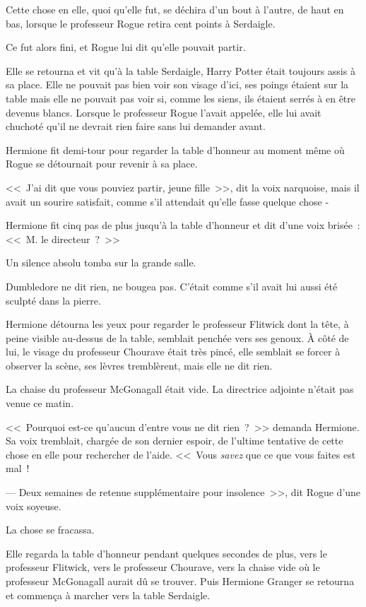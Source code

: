 Cette chose en elle, quoi qu'elle fut, se déchira d'un bout à l'autre, de haut en bas, lorsque le professeur Rogue retira cent points à Serdaigle.

Ce fut alors fini, et Rogue lui dit qu'elle pouvait partir.

Elle se retourna et vit qu'à la table Serdaigle, Harry Potter était toujours assis à sa place. Elle ne pouvait pas bien voir son visage d'ici, ses poings étaient sur la table mais elle ne pouvait pas voir si, comme les siens, ils étaient serrés à en être devenus blancs. Lorsque le professeur Rogue l'avait appelée, elle lui avait chuchoté qu'il ne devrait rien faire sans lui demander avant.

Hermione fit demi-tour pour regarder la table d'honneur au moment même où Rogue se détournait pour revenir à sa place.

<<~J'ai dit que vous pouviez partir, jeune fille~>>, dit la voix narquoise, mais il avait un sourire satisfait, comme s'il attendait qu'elle fasse quelque chose -

Hermione fit cinq pas de plus jusqu'à la table d'honneur et dit d'une voix brisée~: <<~M. le directeur~?~>>

Un silence absolu tomba sur la grande salle.

Dumbledore ne dit rien, ne bougea pas. C'était comme s'il avait lui aussi été sculpté dans la pierre.

Hermione détourna les yeux pour regarder le professeur Flitwick dont la tête, à peine visible au-dessus de la table, semblait penchée vers ses genoux. À côté de lui, le visage du professeur Chourave était très pincé, elle semblait se forcer à observer la scène, ses lèvres tremblèrent, mais elle ne dit rien.

La chaise du professeur McGonagall était vide. La directrice adjointe n'était pas venue ce matin.

<<~Pourquoi est-ce qu'aucun d'entre vous ne dit rien~?~>> demanda Hermione. Sa voix tremblait, chargée de son dernier espoir, de l'ultime tentative de cette chose en elle pour rechercher de l'aide. <<~Vous \emph{savez} que ce que vous faites est mal~!

--- Deux semaines de retenue supplémentaire pour insolence~>>, dit Rogue d'une voix soyeuse.

La chose se fracassa.

Elle regarda la table d'honneur pendant quelques secondes de plus, vers le professeur Flitwick, vers le professeur Chourave, vers la chaise vide où le professeur McGonagall aurait dû se trouver. Puis Hermione Granger se retourna et commença à marcher vers la table Serdaigle.

